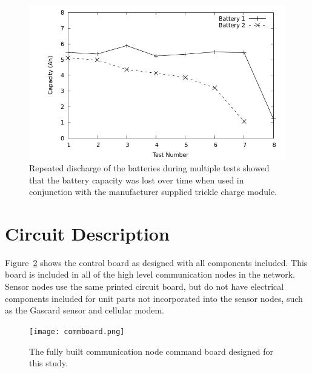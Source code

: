 \documentclass[numbook, envcountsect, envcountsame, envcountreset, runningheads, twocolumn]{svjour3}
\begin{document}
			\begin{figure}[!t]
				\centering
				\includegraphics[width=\columnwidth,height=0.8\columnwidth,keepaspectratio]{decay.pdf}
				\caption[Battery Decay with Repeated Discharge]{Repeated discharge of the batteries during multiple tests showed that the battery capacity was lost over time when used in conjunction with the manufacturer supplied trickle charge module.}
				\label{fig:batterydecay}
			\end{figure}
		
	\section{Circuit Description}
		
		Figure~\ref{fig:board} shows the control board as designed with all components included.  This board is included in all of the high level communication nodes in the network.  Sensor nodes use the same printed circuit board, but do not have electrical components included for unit parts not incorporated into the sensor nodes, such as the Gascard sensor and cellular modem.  
		
		\begin{figure}[!t]
			\centering
			\texttt{[image: commboard.png]}
			\caption[Control board]{The fully built communication node command board designed for this study.}
			\label{fig:board}
		\end{figure}
		
\end{document}
